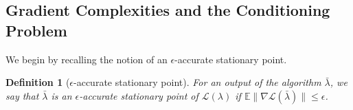 \documentclass[11pt, twoside]{report}
\newtheorem{definition}[theorem]{Definition}
\begin{document}

\subsection{Gradient Complexities and the Conditioning Problem} \label{mu_comp}
We begin by recalling the notion of an $\epsilon$-accurate stationary point.
\begin{definition}[$\epsilon$-accurate stationary point]
    For an output of the algorithm $\bar{\lambda}$, we say that $\bar{\lambda}$ is an $\epsilon$-accurate stationary point of $\mathcal{L}(\lambda)$ if $\mathbb{E}\|\nabla\mathcal{L}(\bar{\lambda})\| \leq \epsilon$.
\end{definition}
\end{document}
